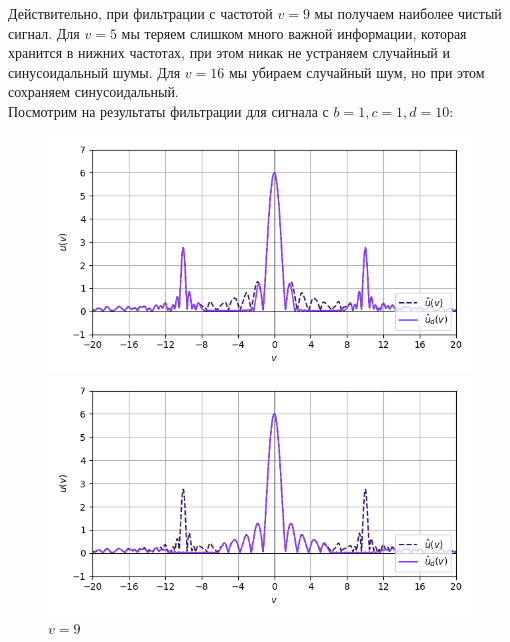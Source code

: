 \documentclass[a4paper]{article}
\begin{document}
Действительно, при фильтрации с частотой $v = 9$ мы получаем наиболее чистый сигнал. Для $v = 5$ мы теряем слишком много важной информации, которая хранится в нижних частотах, при этом никак не устраняем случайный и синусоидальный шумы. Для $v = 16$ мы убираем случайный шум, но при этом сохраняем синусоидальный.\\[0.5em]
Посмотрим на результаты фильтрации для сигнала с $b=1, c=1, d=10$:
\begin{figure}[H]
    \begin{minipage}{0.33\textwidth}
        \centering \includegraphics[width=\textwidth]{sources/band-stop filter/fourier (b=1, c=1, d=10, v=5).png}
        \caption{$v = 5$}
    \end{minipage}\hfill
    \begin{minipage}{0.33\textwidth}
        \centering \includegraphics[width=\textwidth]{sources/band-stop filter/fourier (b=1, c=1, d=10, v=9).png}
        \caption{$v = 9$}
    \end{minipage}\hfill
    \begin{minipage}{0.33\textwidth}

\end{minipage}
\end{figure}
\end{document}
